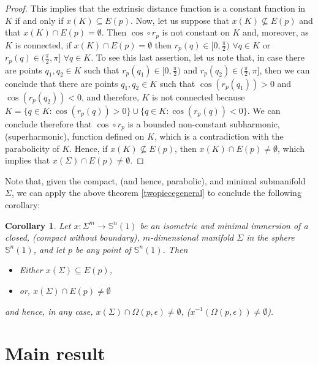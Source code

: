 \documentclass{amsart}
\newtheorem{corollary}[theorem]{Corollary}
\theoremstyle{definition}
\theoremstyle{remark}
\begin{document}
\begin{proof}
This implies that the extrinsic distance function is a constant function in $K$ if and only if $x(K)\subseteq E(p)$.
Now,  let us suppose that $x(K) \not\subseteq E(p)$ and that $x(K)\cap  E(p)=\emptyset$. Then $\cos\circ r_p$ is not constant on $K$ and, moreover, as $K$ is connected,  if $x(K)\cap  E(p)=\emptyset$ then $r_p(q) \in [0,\frac{\pi}{2})\,\,\forall q \in K$ or $r_p(q) \in (\frac{\pi}{2},\pi]\,\,\forall q \in K$. To see this last assertion, let us note that, in case there are points $q_1, q_2 \in K$ such that $r_p(q_1) \in [0,\frac{\pi}{2})$ and  $r_p(q_2) \in (\frac{\pi}{2},\pi]$, then we can conclude that there are points $q_1, q_2 \in K$ such that $\cos(r_p(q_1)) >0$ and  $\cos (r_p(q_2)) <0$, and therefore, $K$ is not connected because $K=\{ q \in K: \cos(r_p(q)) >0\}\cup \{ q \in K: \cos(r_p(q))< 0\} $. We can conclude therefore that $\cos\circ r_p$ is a bounded non-constant subharmonic, (superharmonic), function defined on $K$, which is a contradiction with the parabolicity of $K$. Hence, if  $x(K) \not\subseteq E(p)$, then $x(K)\cap  E(p)\neq \emptyset$, which implies that $x(\Sigma)\cap  E(p)\neq \emptyset$.\end{proof}
Note that, given the compact, (and hence, parabolic), and minimal submanifold $\Sigma$, we can apply  the above theorem \ref{twopiecegeneral} to conclude the following corollary:
\begin{corollary}\label{cortwo}
	Let  $x: \Sigma^m \to \mathbb{S}^n(1)$ be an isometric and minimal immersion of a closed, (compact without boundary), $m$-dimensional manifold $\Sigma$ in the sphere  $\mathbb{S}^n(1)$, and let $p$ be any point of $\mathbb{S}^n(1)$.  Then
    \begin{itemize}
        \item Either $x(\Sigma)\subseteq E(p)$, 
        \item or, $x(\Sigma)\cap E(p)\neq \emptyset$
            \end{itemize}
            and  hence, in any case,  $x(\Sigma) \cap \Omega(p,\epsilon) \neq \emptyset$, ($x^{-1}(\Omega(p,\epsilon))\neq \emptyset$).
\end{corollary}

\section{Main result}
\end{document}
